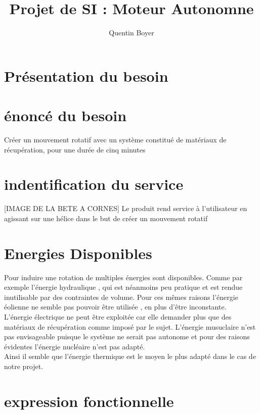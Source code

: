 \documentclass[a4paper,12pt]{article}
\title{Projet de SI : Moteur Autonomne}
\author{Quentin Boyer}
\begin{document}
\maketitle
\tableofcontents
\section{Présentation du besoin}

\section{énoncé du besoin}

Créer un mouvement rotatif  avec un système constitué de matériaux de récupération, pour une durée de  cinq minutes

\section{indentification du service}

[IMAGE DE LA BETE A CORNES]
Le produit rend service à l'utilisateur en agissant sur une hélice dans le but de créer un mouvement rotatif

\section{Energies Disponibles}

\indent Pour induire une rotation de multiples énergies sont disponibles. Comme par exemple l'énergie hydraulique , qui est néanmoins peu pratique et est rendue inutilisable par des contraintes de volume. Pour ces mêmes raisons l'énergie éolienne ne semble pas pouvoir être utilisée , en plus d'être inconstante.\\[0.3cm]
\indent L'énergie électrique ne peut être exploitée car elle demander plus que des matériaux de récupération comme imposé par le sujet. L'énergie musuclaire n'est pas envisageable puisque le système ne serait pas autonome et pour des raisons évidentes l'énergie nucléaire n'est pas adapté.\\[0.3cm]
\indent Ainsi il semble que l'énergie thermique est le moyen le plus adapté dans le cas de notre projet.\\[0.05cm]

\pagebreak

\section{expression fonctionnelle}
\end{document}

